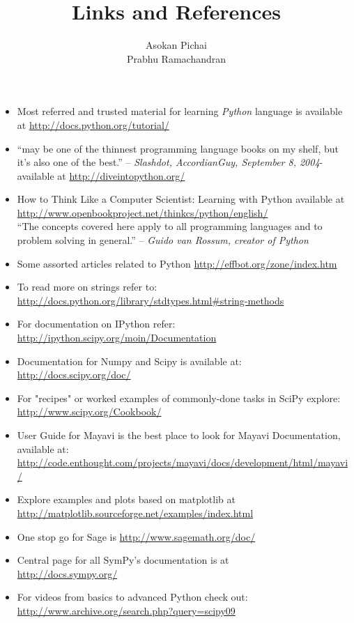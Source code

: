 \documentclass[12pt]{article}
\title{Links and References}
\author{Asokan Pichai\\Prabhu Ramachandran}
\begin{document}
\maketitle
\begin{itemize}
  \item Most referred and trusted material for learning \emph{Python} language is available at \url{http://docs.python.org/tutorial/}
  \item ``may be one of the thinnest programming language books on my shelf, but it's also one of the best.'' -- \emph{Slashdot, AccordianGuy, September 8, 2004}- available at \url{http://diveintopython.org/}
  \item How to Think Like a Computer Scientist: Learning with Python available at \url{http://www.openbookproject.net/thinkcs/python/english/}\\``The concepts covered here apply to all programming languages and to problem solving in general.'' -- \emph{Guido van Rossum, creator of Python}
  \item Some assorted articles related to Python \url{http://effbot.org/zone/index.htm}
  \item To read more on strings refer to: \\ \url{http://docs.python.org/library/stdtypes.html#string-methods}
  \item For documentation on IPython refer: \\ \url{http://ipython.scipy.org/moin/Documentation}
  \item Documentation for Numpy and Scipy is available at: \url{http://docs.scipy.org/doc/}
  \item For "recipes" or worked examples of commonly-done tasks in SciPy explore: \url{http://www.scipy.org/Cookbook/}
  \item User Guide for Mayavi is the best place to look for Mayavi Documentation, available at: \\ \url{http://code.enthought.com/projects/mayavi/docs/development/html/mayavi/}
  \item Explore examples and plots based on matplotlib at \\ \url{http://matplotlib.sourceforge.net/examples/index.html}
  \item One stop go for Sage is \url{http://www.sagemath.org/doc/}
  \item Central page for all SymPy’s documentation is at \\ \url{http://docs.sympy.org/}
  \item For videos from basics to advanced Python check out: \\ \url{http://www.archive.org/search.php?query=scipy09}

\end{itemize}
\end{document}
